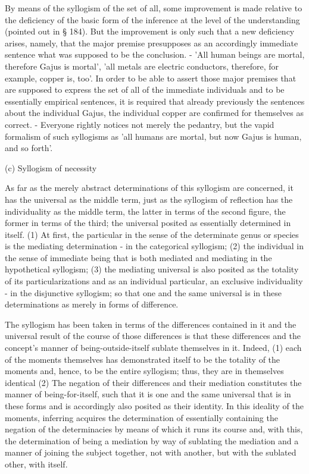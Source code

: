 By means of the syllogism of the set of all, some improvement is made
relative to the deficiency of the basic form of the inference at the level
of the understanding (pointed out in § 184). But the improvement is
only such that a new deficiency arises, namely, that the major premise
presupposes as an accordingly immediate sentence what was supposed to
be the conclusion. - 'All human beings are mortal, therefore Gajus is mortal',
'all metals are electric conductors, therefore, for example, copper is, too'. In
order to be able to assert those major premises that are supposed to express
the set of all of the immediate individuals and to be essentially empirical
sentences, it is required that already previously the sentences about the
individual Gajus, the individual copper are confirmed for themselves as
correct. - Everyone rightly notices not merely the pedantry, but the vapid
formalism of such syllogisms as 'all humans are mortal, but
now Gajus is human, and so forth'.

(c) Syllogism of necessity

As far as the merely abstract determinations of this syllogism are concerned,
it has the universal as the middle term, just as the syllogism of reflection
has the individuality as the middle term,
the latter in terms of the second figure, the former in terms of the third;
the universal posited as essentially determined in itself.
(1) At first, the particular in the sense of the determinate genus or species is
the mediating determination - in the categorical syllogism;
(2) the individual in the sense of immediate being that is
both mediated and mediating in the hypothetical syllogism;
(3) the mediating universal is also posited as the totality of
its particularizations and as an individual particular,
 an exclusive individuality - in the disjunctive syllogism;
so that one and the same universal is in these determinations as
merely in forms of difference.

The syllogism has been taken in terms of the differences contained in it and
the universal result of the course of those differences is that
these differences and the concept's manner of being-outside-itself
sublate themselves in it.
Indeed, (1) each of the moments themselves has demonstrated itself to be
the totality of the moments and, hence, to be the entire syllogism;
thus, they are in themselves identical
(2) The negation of their differences and their mediation constitutes the
manner of being-for-itself, such that it is one and the same universal
that is in these forms and is accordingly also posited as their identity.
In this ideality of the moments, inferring acquires the determination
of essentially containing the negation of the determinacies by means of
which it runs its course and, with this, the determination of being a
mediation by way of sublating the mediation and a manner of joining
the subject together, not with another, but with the sublated other,
with itself.

